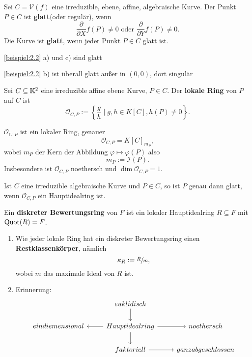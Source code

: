 \begin{definition}
    Sei $C = \mathcal{V}(f)$ eine irreduzible, ebene, affine, algebraische Kurve. Der Punkt $P \in C$ ist
    \textbf{glatt}(oder regulär), wenn
    $$ \frac{\partial}{\partial X}f(P) \neq 0 \text{ oder } \frac{\partial}{\partial Y} f(P) \neq 0.$$
    Die Kurve ist \textbf{glatt}, wenn jeder Punkt $P \in C$ glatt ist.
\end{definition}

\begin{beispiel}
    \cref{beispiel:2.2} a) und c) sind glatt

    \cref{beispiel:2.2} b) ist überall glatt außer in $(0,0)$, dort singulär
\end{beispiel}

\begin{definition}
    Sei $C\subseteq \mathbb{K}^2$ eine irreduzible affine ebene Kurve, $P \in C$. 
    Der \textbf{lokale Ring} von $P$ auf $C$ ist
    $$ \mathcal{O}_{C,P} := \left\{\frac{g}{h}\mid g,h\in K[C], h(P) \ne0\right\}.$$
\end{definition}

\begin{bemerkungnr}
    $\mathcal{O}_{C,P}$ ist ein lokaler Ring, genauer
    $$ \mathcal{O}_{C,P} = K[C]_{m_P},$$
    wobei $m_P$ der Kern der Abbildung $\varphi \mapsto \varphi(P)$ also
    $$ m_P := \mathcal{I}(P). $$
    Insbesondere ist $\mathcal{O}_{C,P}$ noethersch und $\dim \mathcal{O}_{C,P} = 1$.
\end{bemerkungnr}

\begin{satz}
    Ist $C$ eine irreduzible algebraische Kurve und $P \in C$, so ist $P$ genau dann glatt, wenn 
    $\mathcal{O}_{C,P}$ ein Hauptidealring ist.
\end{satz}

\begin{definition}
    Ein \textbf{diskreter Bewertungsring} von $F$ ist ein lokaler Hauptidealring $R \subseteq F$ mit $\operatorname{Quot}(R) = F$.
\end{definition}

\begin{bemerkungnr}
    \begin{enumerate}[label=\alph*)]
        \item Wie jeder lokale Ring hat ein diskreter Bewertungsring einen \textbf{Restklassenkörper}, nämlich
        $$ \kappa_R := \sfrac{R}{m}, $$
        wobei $m$ das maximale Ideal von $R$ ist.

        \item Erinnerung:
        $$\begin{tikzcd}
            & euklidisch \dar& \\
            eindiemensional & \lar Hauptidealring \dar \rar & noethersch\\
            & faktoriell \rar & ganz abgeschlossen
        \end{tikzcd}$$
    \end{enumerate}
\end{bemerkungnr}

